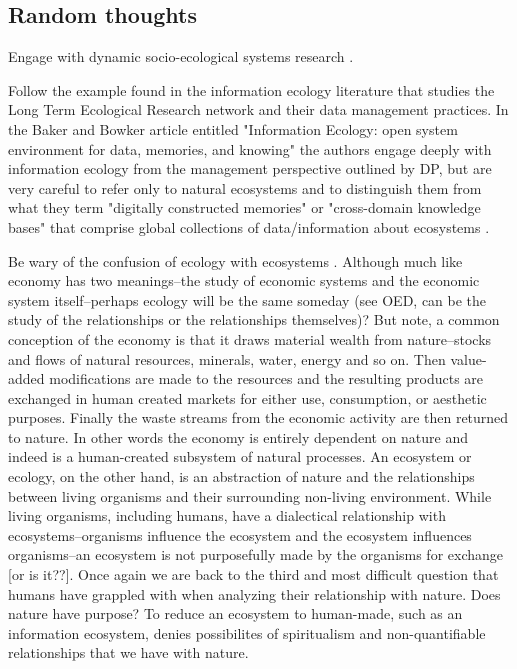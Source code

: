 \subsection{Random thoughts}

Engage with dynamic socio-ecological systems research \citep{liu_etal_2007}.

Follow the example found in the information ecology literature that studies the Long Term Ecological Research network and their data management practices. In the Baker and Bowker article entitled "Information Ecology: open system environment for data, memories, and knowing" the authors engage deeply with information ecology from the management perspective outlined by DP, but are very careful to refer only to natural ecosystems and to distinguish them from what they term "digitally constructed memories" or "cross-domain knowledge bases" that comprise global collections of data/information about ecosystems \citep[][p. 131]{baker_2007}.

Be wary of the confusion of ecology with ecosystems \citep[cf. ][]{lucas_2012,nardi_information_1999}. Although much like economy has two meanings--the study of economic systems and the economic system itself--perhaps ecology will be the same someday (see OED, can be the study of the relationships or the relationships themselves)? But note, a common conception of the economy is that it draws material wealth from nature--stocks and flows of natural resources, minerals, water, energy and so on. Then value-added modifications are made to the resources and the resulting products are exchanged in human created markets for either use, consumption, or aesthetic purposes. Finally the waste streams from the economic activity are then returned to nature. In other words the economy is entirely dependent on nature and indeed is a human-created subsystem of natural processes. An ecosystem or ecology, on the other hand, is an abstraction of nature and the relationships between living organisms and their surrounding non-living environment. While living organisms, including humans, have a dialectical relationship with ecosystems--organisms influence the ecosystem and the ecosystem influences organisms--an ecosystem is not purposefully made by the organisms for exchange [or is it??]. Once again we are back to the third and most difficult question that humans have grappled with when analyzing their relationship with nature. Does nature have purpose? To reduce an ecosystem to human-made, such as an information ecosystem, denies possibilites of spiritualism and non-quantifiable relationships that we have with nature.
